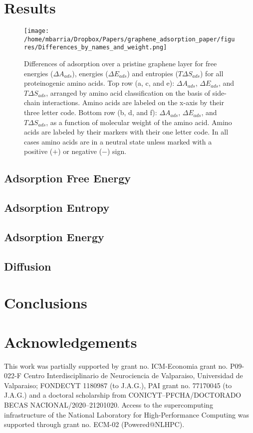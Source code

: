 \documentclass[twoside,twocolumn,9pt]{article}
\begin{document}
\section{Results}

\begin{figure*}[htbp]
\centerline{\texttt{[image: /home/mbarria/Dropbox/Papers/graphene\_adsorption\_paper/figures/Differences\_by\_names\_and\_weight.png]}}
\caption[]{\label{fig:differences} Differences of adsorption over a
  pristine graphene layer for free energies ($\Delta A_{ads}$),
  energies ($\Delta E_{ads}$) and entropies ($T \Delta S_{ads}$) for
  all proteinogenic amino acids. Top row (a, c, and e):
  $\Delta A_{ads}$, $\Delta E_{ads}$, and $T \Delta S_{ads}$, arranged
  by amino acid classification on the basis of side-chain
  interactions. Amino acids are labeled on the x-axis by their three
  letter code. Bottom row (b, d, and f): $\Delta A_{ads}$,
  $\Delta E_{ads}$, and $T \Delta S_{ads}$, as a function of molecular
  weight of the amino acid. Amino acids are labeled by their markers
  with their one letter code. In all cases amino acids are in a
  neutral state unless marked with a positive ($+$) or negative ($-$)
  sign.}

\end{figure*}

\subsection{Adsorption Free Energy}

\subsection{Adsorption Entropy}

\subsection{Adsorption Energy}

\subsection{Diffusion}

\section{Conclusions}


\section*{Acknowledgements}
This work was partially supported by grant no. ICM-Economia grant
no. P09-022-F Centro Interdisciplinario de Neurociencia de Valparaiso,
Universidad de Valparaiso; FONDECYT 1180987 (to J.A.G.), PAI grant
no. 77170045 (to J.A.G.) and a doctoral scholarship from
CONICYT--PFCHA/DOCTORADO BECAS NACIONAL/2020--21201020.  Access to the
supercomputing infrastructure of the National Laboratory for
High-Performance Computing was supported through grant no. ECM-02
(Powered@NLHPC).




\end{document}
